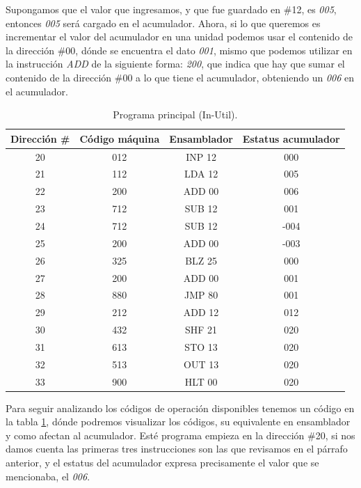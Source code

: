 \documentclass[letterpaper,12pt,oneside]{book}
\begin{document}
    Supongamos que el valor
	que ingresamos, y que fue guardado en 
	\#12, es \textit{005}, entonces \textit{005} será cargado en el acumulador. Ahora, si lo que queremos es incrementar el valor
	del acumulador en una unidad podemos usar el contenido de la dirección \#00, dónde se encuentra el dato \textit{001},
	mismo que podemos utilizar en la instrucción \textit{ADD} de la siguiente forma: \textit{200}, que indica que hay que sumar el contenido de la 
	dirección \#00 a lo que tiene
	el acumulador, obteniendo un \textit{006} en el acumulador.
	
	\begin{table}[h]
	  \centering
	  \begin{tabular}{|c|c|c|c|}
	    \hline
    	\textbf{Dirección \#} & \textbf{Código máquina} & \textbf{Ensamblador} & \textbf{Estatus acumulador} \\
	    \hline
	     20 & 012 & INP 12 & 000 \\
	     21 & 112 & LDA 12 & 005\\
	     22 & 200 & ADD 00 & 006\\
	     23 & 712 & SUB 12 & 001\\
	     24 & 712 & SUB 12 & -004\\
	     25 & 200 & ADD 00 & -003\\
	     26 & 325 & BLZ 25 & 000\\
	     27 & 200 & ADD 00 & 001\\
	     28 & 880 & JMP 80 & 001\\
	     29 & 212 & ADD 12 & 012\\
	     30 & 432 & SHF 21 & 020\\
	     31 & 613 & STO 13 & 020\\
	     32 & 513 & OUT 13 & 020\\
	     33 & 900 & HLT 00 & 020\\
	    \hline
	  \end{tabular}
	  \caption{Programa principal (In-Util). }
	  \label{tab:Programa_Principal}
	\end{table}
	
	Para seguir analizando los códigos de operación disponibles tenemos un código en la tabla \ref{tab:Programa_Principal}, dónde
	podremos visualizar los códigos, su equivalente en ensamblador y como afectan al acumulador. Esté programa empieza en la
	dirección \#20, si nos damos cuenta las primeras tres instrucciones son las que revisamos en el párrafo anterior, y el
	estatus del acumulador expresa precisamente el valor que se mencionaba, el \textit{006}.
\end{document}
